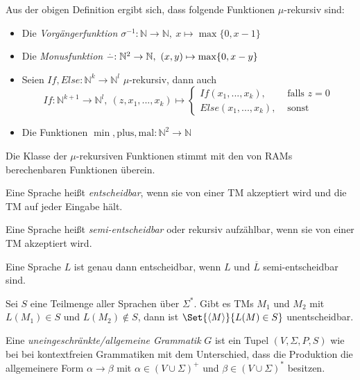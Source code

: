 \documentclass{cheat-sheet}
\newcommand{\monus}{\stackrel{{}^{\scriptstyle .}}{\smash{-}}}
\begin{document}
\begin{bem}
Aus der obigen Definition ergibt sich, dass folgende Funktionen $\mu$-rekursiv sind:
\begin{itemize}
  \item Die \it{Vorgängerfunktion} $\sigma^{-1} : \mathbb{N} \to \mathbb{N},\ x \mapsto \max\{0, x - 1\}$
  \item Die \it{Monusfunktion} $\monus : \mathbb{N}^{2} \to \mathbb{N},\ (x, y) \mapsto \max\{0, x - y\}$
  \item Seien $If, Else : \mathbb{N}^k \to \mathbb{N}^{l}$ $\mu$-rekursiv, dann auch
    \[ If : \mathbb{N}^{k + 1} \to \mathbb{N}^{l},\ (z, x_1, ..., x_k) \mapsto \begin{cases}If(x_1, ..., x_k), & \text{ falls } z = 0\\Else(x_1, ..., x_k), & \text{ sonst }\end{cases} \]
  \item Die Funktionen $\min, \mathrm{plus}, \mathrm{mal} : \mathbb{N}^2 \to \mathbb{N}$

\end{itemize}
\end{bem}

\begin{bem}
Die Klasse der $\mu$-rekursiven Funktionen stimmt mit den von RAMs berechenbaren Funktionen überein.
\end{bem}

\begin{defn}
Eine Sprache heißt \emph{entscheidbar}, wenn sie von einer TM akzeptiert wird und die TM auf jeder Eingabe hält.
\end{defn}

\begin{defn}
Eine Sprache heißt \emph{semi-entscheidbar} oder rekursiv aufzählbar, wenn sie von einer TM akzeptiert wird.
\end{defn}

\begin{satz}
Eine Sprache $L$ ist genau dann entscheidbar, wenn $L$ und $\overline{L}$ semi-entscheidbar sind.
\end{satz}

\begin{satz}
Sei $S$ eine Teilmenge aller Sprachen über $\Sigma^{*}$. Gibt es TMs $M_{1}$ und $M_{2}$ mit $L(M_{1}) \in S$ und $L(M_{2}) \not\in S$, dann ist $\Set{ \langle M \rangle }{ L(M) \in S }$ unentscheidbar.
\end{satz}

\begin{defn}
Eine \emph{uneingeschränkte/allgemeine Grammatik} $G$ ist ein Tupel $(V, \Sigma, P, S)$ wie bei bei kontextfreien Grammatiken mit dem Unterschied, dass die Produktion die allgemeinere Form $\alpha \longrightarrow \beta$ mit $\alpha \in (V \cup \Sigma)^{+}$ und $\beta \in (V \cup \Sigma)^{*}$ besitzen.
\end{defn}
\end{document}
